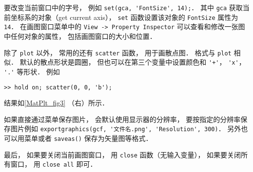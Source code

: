 要改变当前窗口中的字号， 例如 \verb|set(gca, 'FontSize', 14);|． 其中 \verb|gca| 获取当前坐标系的对象（get current axis）， \verb|set| 函数设置该对象的 \verb|FontSize| 属性为 \verb|14|． 在画图窗口菜单中的 \verb|View -> Property Inspector| 可以查看和修改一张图中任何对象的属性， 包括画图窗口的大小和位置．

除了 \verb|plot| 以外， 常用的还有 \verb|scatter| 函数， 用于画散点图． 格式与 \verb|plot| 相似． 默认的散点形状是圆圈， 但也可以在第三个变量中设置颜色和 \verb|'+'|， \verb|'x'|， \verb|'.'| 等形状． 例如
\begin{lstlisting}[language=matlabC]
>> hold on; scatter(0, 0, 'b');
\end{lstlisting}
结果如\autoref{MatPlt_fig3} （右）所示．

如果直接通过菜单保存图片， 会默认使用显示器的分辨率， 要按指定的分辨率保存图片例如 \verb|exportgraphics(gcf, '文件名.png', 'Resolution', 300)|． 另外也可以用菜单或者 \verb|saveas()| 保存为矢量图等格式．

最后， 如果要关闭当前画图窗口， 用 \verb|close| 函数（无输入变量）， 如果要关闭所有窗口， 用 \verb|close all| 即可．


